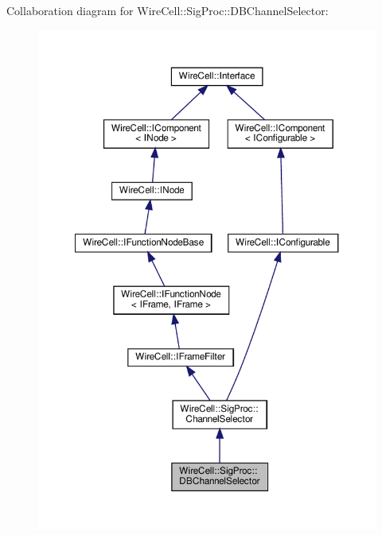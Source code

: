 Collaboration diagram for Wire\+Cell\+:\+:Sig\+Proc\+:\+:D\+B\+Channel\+Selector\+:
\nopagebreak
\begin{figure}[H]
\begin{center}
\leavevmode
\includegraphics[width=350pt]{class_wire_cell_1_1_sig_proc_1_1_d_b_channel_selector__coll__graph}
\end{center}
\end{figure}
